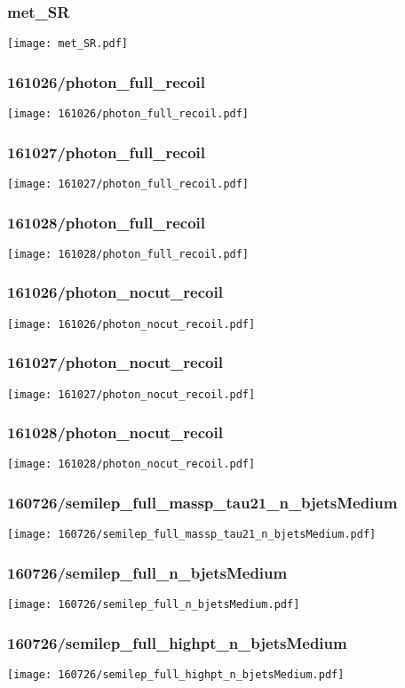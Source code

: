 \begin{frame}
   \frametitle{\small met\_SR}
   \centering
   \texttt{[image: met\_SR.pdf]}
\end{frame}

\begin{frame}
   \frametitle{\small 161026/photon\_full\_recoil}
   \centering
   \texttt{[image: 161026/photon\_full\_recoil.pdf]}
\end{frame}

\begin{frame}
   \frametitle{\small 161027/photon\_full\_recoil}
   \centering
   \texttt{[image: 161027/photon\_full\_recoil.pdf]}
\end{frame}

\begin{frame}
   \frametitle{\small 161028/photon\_full\_recoil}
   \centering
   \texttt{[image: 161028/photon\_full\_recoil.pdf]}
\end{frame}

\begin{frame}
   \frametitle{\small 161026/photon\_nocut\_recoil}
   \centering
   \texttt{[image: 161026/photon\_nocut\_recoil.pdf]}
\end{frame}

\begin{frame}
   \frametitle{\small 161027/photon\_nocut\_recoil}
   \centering
   \texttt{[image: 161027/photon\_nocut\_recoil.pdf]}
\end{frame}

\begin{frame}
   \frametitle{\small 161028/photon\_nocut\_recoil}
   \centering
   \texttt{[image: 161028/photon\_nocut\_recoil.pdf]}
\end{frame}

\begin{frame}
   \frametitle{\small 160726/semilep\_full\_massp\_tau21\_n\_bjetsMedium}
   \centering
   \texttt{[image: 160726/semilep\_full\_massp\_tau21\_n\_bjetsMedium.pdf]}
\end{frame}

\begin{frame}
   \frametitle{\small 160726/semilep\_full\_n\_bjetsMedium}
   \centering
   \texttt{[image: 160726/semilep\_full\_n\_bjetsMedium.pdf]}
\end{frame}

\begin{frame}
   \frametitle{\small 160726/semilep\_full\_highpt\_n\_bjetsMedium}
   \centering
   \texttt{[image: 160726/semilep\_full\_highpt\_n\_bjetsMedium.pdf]}
\end{frame}

